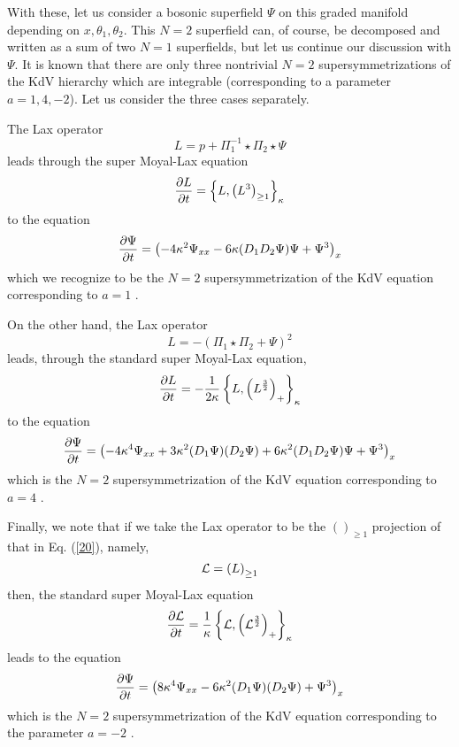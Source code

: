 \documentclass[a4paper,11pt]{article}
\begin{document}
With these, let us consider a bosonic superfield $\Psi$ on this graded
manifold depending on $x,\theta_{1},\theta_{2}$. This $N=2$ superfield can,
of course, be decomposed and written as a sum of two $N=1$
superfields, but let us continue our discussion with $\Psi$. It is
known that there are only three nontrivial $N=2$ supersymmetrizations of
the KdV hierarchy which are integrable (corresponding to a parameter
$a=1,4, -2$). Let us consider the three cases separately. 

The Lax operator
\begin{equation}
L = p + \Pi_{1}^{-1}\star \Pi_{2}\star \Psi
\end{equation}
leads through the super Moyal-Lax equation
\begin{equation}
{\partial L\over \partial t} = \left\{L, \left(L^{3}\right)_{\geq
1}\right\}_{\kappa}
\end{equation}
to the equation
\begin{equation}
{\partial \Psi\over \partial t} = \left(-4\kappa^{2} \Psi_{xx} -
6\kappa (D_{1}D_{2}\Psi) \Psi + \Psi^{3}\right)_{x}
\end{equation}
which we recognize to be the $N=2$ supersymmetrization of the KdV
equation corresponding to $a=1$ \cite{6}.

On the other hand, the Lax operator
\begin{equation}
L = - \left(\Pi_{1}\star \Pi_{2} + \Psi\right)^{2}\label{20}
\end{equation}
leads, through the standard super Moyal-Lax equation,
\begin{equation}
{\partial L\over \partial t} = -{1\over 2\kappa} \left\{L,
\left(L^{3\over 2}\right)_{+}\right\}_{\kappa}
\end{equation}
to the equation
\begin{equation}
{\partial \Psi\over \partial t} = \left(-4\kappa^{4} \Psi_{xx} +
3\kappa^{2} (D_{1}\Psi) (D_{2}\Psi) + 6\kappa^{2} (D_{1}D_{2}\Psi)
\Psi + \Psi^{3}\right)_{x}
\end{equation}
which is the $N=2$ supersymmetrization of the KdV equation
corresponding to $a=4$ \cite{3}.

Finally, we note that if we take the Lax operator to be the $()_{\geq
1}$ projection of that in Eq. (\ref{20}), namely,
\begin{equation}
{\cal L} = \left(L\right)_{\geq 1}
\end{equation}
then, the standard super Moyal-Lax equation
\begin{equation}
{\partial {\cal L}\over \partial t} = {1\over \kappa} \left\{{\cal
L},\left({\cal L}^{3\over 2}\right)_{+}\right\}_{\kappa}
\end{equation}
leads to the equation
\begin{equation}
{\partial \Psi\over \partial t} = \left(8\kappa^{4} \Psi_{xx} -
6\kappa^{2} (D_{1}\Psi) (D_{2}\Psi) + \Psi^{3}\right)_{x}\label{b}
\end{equation}
which is the $N=2$ supersymmetrization of the KdV equation
corresponding to the parameter $a=-2$ \cite{3}.
\end{document}
